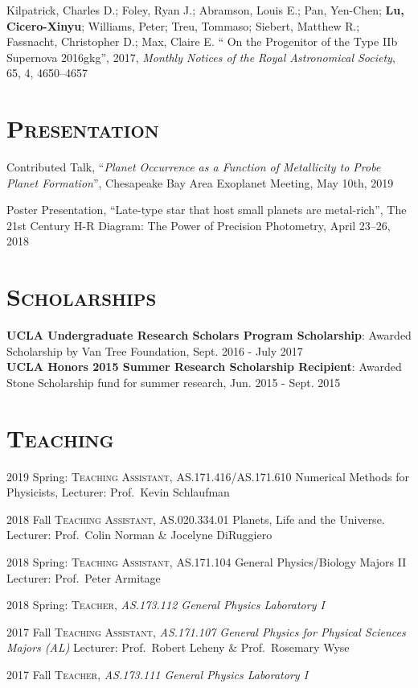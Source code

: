 \documentclass[line, margin]{res}
\begin{document}
\begin{resume}
Kilpatrick, Charles D.; Foley, Ryan J.; Abramson, Louis E.; Pan, Yen-Chen; \textbf{Lu, Cicero-Xinyu}; Williams, Peter; Treu, Tommaso; Siebert, Matthew R.; Fassnacht, Christopher D.; Max, Claire E.  \enquote{ On the Progenitor of the Type IIb Supernova 2016gkg}, 2017, \textsl{Monthly Notices of the Royal Astronomical Society}, 65, 4, 4650--4657

\section{\textsc{Presentation}}
Contributed Talk, ``\textit{Planet Occurrence as a Function of Metallicity to Probe Planet Formation}'', Chesapeake Bay Area Exoplanet Meeting, May 10th, 2019

Poster Presentation, ``Late-type star that host small planets are metal-rich'', The 21st Century H-R Diagram: The Power of Precision Photometry, April 23--26, 2018
\section{\textsc{Scholarships} }
\textbf{UCLA Undergraduate Research Scholars Program Scholarship}: Awarded Scholarship by Van Tree Foundation, Sept. 2016 - July 2017\\
\textbf{UCLA Honors 2015 Summer Research Scholarship Recipient}: Awarded Stone Scholarship fund for summer research, Jun. 2015 - Sept. 2015

\section{\textsc{Teaching}}
2019 Spring: \textsc{Teaching Assistant}, AS.171.416/AS.171.610 Numerical Methods for Physicists, Lecturer: Prof.\ Kevin Schlaufman

2018 Fall \textsc{Teaching Assistant}, 	AS.020.334.01 Planets, Life and the Universe. 
Lecturer: Prof.\ Colin Norman \& Jocelyne DiRuggiero

2018 Spring: \textsc{Teaching Assistant}, AS.171.104 General Physics/Biology Majors II
Lecturer: Prof.\ Peter Armitage

2018 Spring: \textsc{Teacher}, \emph{AS.173.112 General Physics Laboratory I}

2017 Fall \textsc{Teaching Assistant}, \emph{AS.171.107 General Physics for Physical Sciences Majors (AL)} Lecturer: Prof.\ Robert Leheny \& Prof.\ Rosemary Wyse

2017 Fall \textsc{Teacher}, \emph{AS.173.111 General Physics Laboratory I}



\end{resume}
\end{document}
